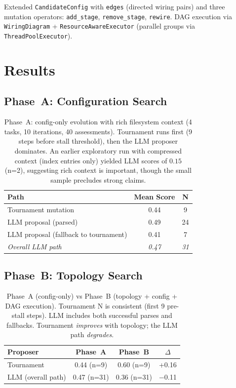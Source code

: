 \documentclass[11pt]{article}
\begin{document}
Extended \texttt{CandidateConfig} with \texttt{edges} (directed wiring
pairs) and three mutation operators: \texttt{add\_stage},
\texttt{remove\_stage}, \texttt{rewire}. DAG execution via
\texttt{WiringDiagram} + \texttt{ResourceAwareExecutor} (parallel groups
via \texttt{ThreadPoolExecutor}).

\section{Results}

\subsection{Phase~A: Configuration Search}

\begin{table}[h]
\centering
\begin{tabular}{lcc}
\toprule
\textbf{Path} & \textbf{Mean Score} & \textbf{N} \\
\midrule
Tournament mutation & 0.44 & 9 \\
LLM proposal (parsed) & 0.49 & 24 \\
LLM proposal (fallback to tournament) & 0.41 & 7 \\
\midrule
\emph{Overall LLM path} & \emph{0.47} & \emph{31} \\
\bottomrule
\end{tabular}
\caption{Phase~A: config-only evolution with rich filesystem context
(4 tasks, 10 iterations, 40 assessments). Tournament runs first (9
steps before stall threshold), then the LLM proposer dominates. An
earlier exploratory run with compressed context (index entries only)
yielded LLM scores of $0.15$ (n=2), suggesting rich context is
important, though the small sample precludes strong claims.}
\end{table}

\subsection{Phase~B: Topology Search}

\begin{table}[h]
\centering
\begin{tabular}{lccc}
\toprule
\textbf{Proposer} & \textbf{Phase~A} & \textbf{Phase~B} & \textbf{$\Delta$} \\
\midrule
Tournament & 0.44 (n=9) & 0.60 (n=9) & +0.16 \\
LLM (overall path) & 0.47 (n=31) & 0.36 (n=31) & $-$0.11 \\
\bottomrule
\end{tabular}
\caption{Phase~A (config-only) vs Phase~B (topology + config + DAG
execution). Tournament N is consistent (first 9 pre-stall steps). LLM
includes both successful parses and fallbacks. Tournament \emph{improves}
with topology; the LLM path \emph{degrades}.}
\end{table}
\end{document}
